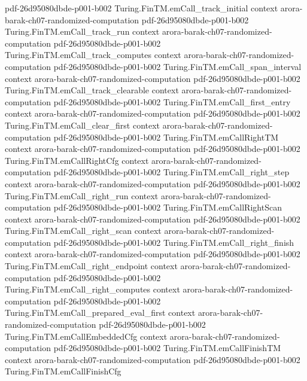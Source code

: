 \begin{theorem}
  {pdf-26d95080dbde-p001-b002}
\proofstep
  {Turing.FinTM.emCall_track_initial}
  {context}
  {arora-barak-ch07-randomized-computation}
  {pdf-26d95080dbde-p001-b002}
\proofstep
  {Turing.FinTM.emCall_track_run}
  {context}
  {arora-barak-ch07-randomized-computation}
  {pdf-26d95080dbde-p001-b002}
\proofstep
  {Turing.FinTM.emCall_track_computes}
  {context}
  {arora-barak-ch07-randomized-computation}
  {pdf-26d95080dbde-p001-b002}
\proofstep
  {Turing.FinTM.emCall_span_interval}
  {context}
  {arora-barak-ch07-randomized-computation}
  {pdf-26d95080dbde-p001-b002}
\proofstep
  {Turing.FinTM.emCall_track_clearable}
  {context}
  {arora-barak-ch07-randomized-computation}
  {pdf-26d95080dbde-p001-b002}
\proofstep
  {Turing.FinTM.emCall_first_entry}
  {context}
  {arora-barak-ch07-randomized-computation}
  {pdf-26d95080dbde-p001-b002}
\proofstep
  {Turing.FinTM.emCall_clear_first}
  {context}
  {arora-barak-ch07-randomized-computation}
  {pdf-26d95080dbde-p001-b002}
\proofstep
  {Turing.FinTM.emCallRightTM}
  {context}
  {arora-barak-ch07-randomized-computation}
  {pdf-26d95080dbde-p001-b002}
\proofstep
  {Turing.FinTM.emCallRightCfg}
  {context}
  {arora-barak-ch07-randomized-computation}
  {pdf-26d95080dbde-p001-b002}
\proofstep
  {Turing.FinTM.emCall_right_step}
  {context}
  {arora-barak-ch07-randomized-computation}
  {pdf-26d95080dbde-p001-b002}
\proofstep
  {Turing.FinTM.emCall_right_run}
  {context}
  {arora-barak-ch07-randomized-computation}
  {pdf-26d95080dbde-p001-b002}
\proofstep
  {Turing.FinTM.emCallRightScan}
  {context}
  {arora-barak-ch07-randomized-computation}
  {pdf-26d95080dbde-p001-b002}
\proofstep
  {Turing.FinTM.emCall_right_scan}
  {context}
  {arora-barak-ch07-randomized-computation}
  {pdf-26d95080dbde-p001-b002}
\proofstep
  {Turing.FinTM.emCall_right_finish}
  {context}
  {arora-barak-ch07-randomized-computation}
  {pdf-26d95080dbde-p001-b002}
\proofstep
  {Turing.FinTM.emCall_right_endpoint}
  {context}
  {arora-barak-ch07-randomized-computation}
  {pdf-26d95080dbde-p001-b002}
\proofstep
  {Turing.FinTM.emCall_right_computes}
  {context}
  {arora-barak-ch07-randomized-computation}
  {pdf-26d95080dbde-p001-b002}
\proofstep
  {Turing.FinTM.emCall_prepared_eval_first}
  {context}
  {arora-barak-ch07-randomized-computation}
  {pdf-26d95080dbde-p001-b002}
\proofstep
  {Turing.FinTM.emCallEmbeddedCfg}
  {context}
  {arora-barak-ch07-randomized-computation}
  {pdf-26d95080dbde-p001-b002}
\proofstep
  {Turing.FinTM.emCallFinishTM}
  {context}
  {arora-barak-ch07-randomized-computation}
  {pdf-26d95080dbde-p001-b002}
\proofstep
  {Turing.FinTM.emCallFinishCfg}

\end{theorem}
